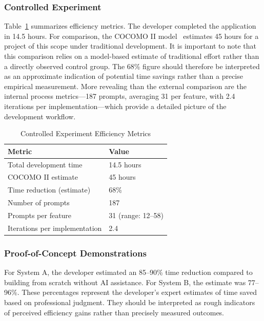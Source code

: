 \documentclass[sigconf]{acmart}
\begin{document}
\subsubsection{Controlled Experiment}

Table~\ref{tab:efficiency} summarizes efficiency metrics. The developer completed the application in 14.5 hours. For comparison, the COCOMO II model~\cite{boehm2000software} estimates 45 hours for a project of this scope under traditional development. It is important to note that this comparison relies on a model-based estimate of traditional effort rather than a directly observed control group. The 68\% figure should therefore be interpreted as an approximate indication of potential time savings rather than a precise empirical measurement. More revealing than the external comparison are the internal process metrics—187 prompts, averaging 31 per feature, with 2.4 iterations per implementation—which provide a detailed picture of the development workflow.

\begin{table}[htbp]
\caption{Controlled Experiment Efficiency Metrics}
\label{tab:efficiency}
\centering
\begin{tabular}{@{}p{}p{}@{}}
\toprule
\textbf{Metric} & \textbf{Value} \\
\midrule
Total development time & 14.5 hours \\
COCOMO II estimate & 45 hours \\
Time reduction (estimate) & 68\% \\
Number of prompts & 187 \\
Prompts per feature & 31 (range: 12--58) \\
Iterations per implementation & 2.4 \\
\bottomrule
\end{tabular}
\end{table}

\subsubsection{Proof-of-Concept Demonstrations}

For System A, the developer estimated an 85–90\% time reduction compared to building from scratch without AI assistance. For System B, the estimate was 77–96\%. These percentages represent the developer's expert estimates of time saved based on professional judgment. They should be interpreted as rough indicators of perceived efficiency gains rather than precisely measured outcomes.
\end{document}
